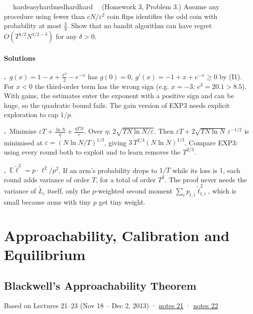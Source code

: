 \documentclass[11pt,a4paper,openany]{book}
\newcommand{\E}{\mathbb{E}}
\newcommand{\eps}{\varepsilon}
\newcommand{\thepartblurb}{}
\newcommand{\chapsource}[1]{{\small\sffamily\color{muted}#1\par}\medskip}
\newcommand{\extag}[2]{%
  \def\tmp{#1}\def\tmpE{easy}\def\tmpM{med}\def\tmpH{hard}%
  \ifx\tmp\tmpE\def\tagc{defc}\else\ifx\tmp\tmpM\def\tagc{thmc}\else\ifx\tmp\tmpH\def\tagc{warnc}\else\def\tagc{finc}\fi\fi\fi
  \tcbox[on line,boxrule=0pt,arc=2pt,colback=\tagc!12,left=2pt,right=2pt,top=0pt,bottom=0pt,boxsep=1pt]{\sffamily\scriptsize\bfseries\color{\tagc}#2}}
\newcommand{\exercise}[3]{\par\medskip\noindent\textbf{\sffamily #1}\ \ #2\ \ #3\par}
\newenvironment{solutions}{\small}{}
\newcommand{\sol}[2]{\par\smallskip\noindent\textbf{\sffamily #1.}\ #2\par}
\begin{document}
\exercise{14.4}{\extag{hard}{challenge}}{\hypertarget{sol-14.4}{}(Homework 3, Problem 3.) Assume any procedure using fewer than $cN/\eps^2$ coin flips identifies the odd coin with probability at most $\frac34$. Show that no bandit algorithm can have regret $O(T^{1/2}N^{1/2-\delta})$ for any $\delta>0$.}

\subsection*{Solutions}
\begin{solutions}
\sol{14.1}{$g(x)=1-x+\frac{x^2}2-e^{-x}$ has $g(0)=0$, $g'(x)=-1+x+e^{-x}\ge0$ by (I1). For $x<0$ the third-order term has the wrong sign (e.g. $x=-3$: $e^3=20.1>8.5$). With gains, the estimates enter the exponent with a positive sign and can be huge, so the quadratic bound fails. The gain version of EXP3 needs explicit exploration to cap $1/p$.}
\sol{14.2}{Minimise $\eps T+\frac{\ln N}{\eta}+\frac{\eta TN}{\eps}$. Over $\eta$: $2\sqrt{TN\ln N/\eps}$. Then $\eps T+2\sqrt{TN\ln N}\,\eps^{-1/2}$ is minimised at $\eps=(N\ln N/T)^{1/3}$, giving $3\,T^{2/3}(N\ln N)^{1/3}$. Compare EXP3: using every round both to exploit and to learn removes the $T^{2/3}$.}
\sol{14.3}{$\E\tilde\ell^2=p\cdot\ell^2/p^2$. If an arm's probability drops to $1/T$ while its loss is $1$, each round adds variance of order $T$, for a total of order $T^2$. The proof never needs the variance of $\tilde L_i$ itself, only the $p$-weighted second moment $\sum_ip_{t,i}\tilde\ell_{t,i}^2$, which is small because arms with tiny $p$ get tiny weight.}
\end{solutions}

\def\thepartblurb{A vector-valued minimax theorem that ties the whole course together.}\part{Approachability, Calibration and Equilibrium}\label{part6}

\chapter[Blackwell approachability]{Blackwell's Approachability Theorem}\label{ch15}
\chapsource{Based on Lectures 21–23 (Nov 18 – Dec 2, 2013) · \href{https://web.eecs.umich.edu/~jabernet/eecs598course/fall2013/web/notes/lec21_111813.pdf}{notes 21} · \href{https://web.eecs.umich.edu/~jabernet/eecs598course/fall2013/web/notes/lec22_112013.pdf}{notes 22}}
\end{document}
